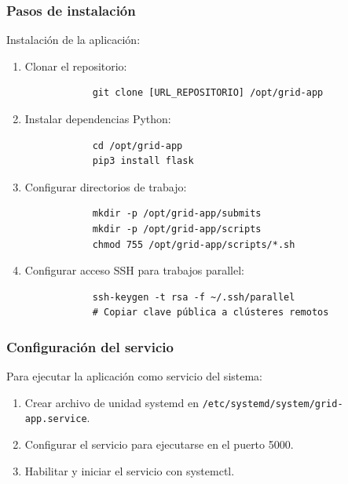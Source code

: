 \subsubsection{Pasos de instalación}
\noindent

Instalación de la aplicación:

\begin{enumerate}
	\item Clonar el repositorio:
	      \begin{verbatim}
			git clone [URL_REPOSITORIO] /opt/grid-app
		\end{verbatim}

	\item Instalar dependencias Python:
	      \begin{verbatim}
			cd /opt/grid-app
			pip3 install flask
		\end{verbatim}

	\item Configurar directorios de trabajo:
	      \begin{verbatim}
			mkdir -p /opt/grid-app/submits
			mkdir -p /opt/grid-app/scripts
			chmod 755 /opt/grid-app/scripts/*.sh
		\end{verbatim}

	\item Configurar acceso SSH para trabajos parallel:
	      \begin{verbatim}
			ssh-keygen -t rsa -f ~/.ssh/parallel
			# Copiar clave pública a clústeres remotos
		\end{verbatim}
\end{enumerate}

\subsubsection{Configuración del servicio}
\noindent

Para ejecutar la aplicación como servicio del sistema:

\begin{enumerate}
	\item Crear archivo de unidad systemd en \texttt{/etc/systemd/system/grid-app.service}.
	\item Configurar el servicio para ejecutarse en el puerto 5000.
	\item Habilitar y iniciar el servicio con systemctl.
\end{enumerate}

